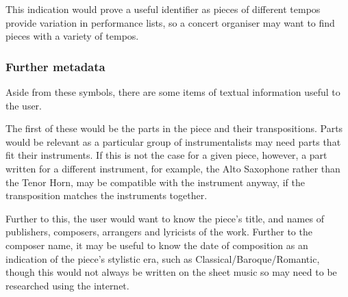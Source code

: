 \documentclass[bibtotocnumbered]{article}
\begin{document}
This indication would prove a useful identifier as pieces of different tempos provide variation in performance lists, so a concert organiser may want to find pieces with a variety of tempos.

\subsubsection{Further metadata}
Aside from these symbols, there are some items of textual information useful to the user. 

The first of these would be the parts in the piece and their transpositions. Parts would be relevant as a particular group of instrumentalists may need parts that fit their instruments. If this is not the case for a given piece, however, a part written for a different instrument, for example, the Alto Saxophone rather than the Tenor Horn, may be compatible with the instrument anyway, if the transposition matches the instruments together.

Further to this, the user would want to know the piece's title, and names of publishers, composers, arrangers and lyricists of the work. Further to the composer name, it may be useful to know the date of composition as an indication of the piece's stylistic era, such as Classical/Baroque/Romantic, though this would not always be written on the sheet music so may need to be researched using the internet.
\end{document}
